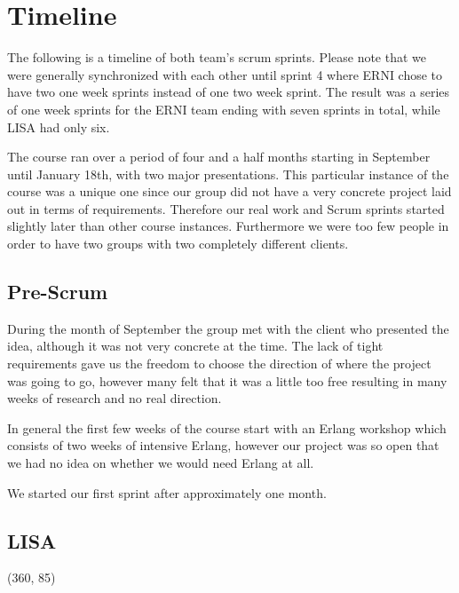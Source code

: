 \section {Timeline}

The following is a timeline of both team's scrum sprints. Please note that we were generally synchronized with each other until sprint 4 where ERNI chose to have two one week sprints instead of one two week sprint. The result was a series of one week sprints for the ERNI team ending with seven sprints in total, while LISA had only six.

The course ran over a period of four and a half months starting in September until January 18th, with two major presentations. This particular instance of the course was a unique one since our group did not have a very concrete project laid out in terms of requirements. Therefore our real work and Scrum sprints started slightly later than other course instances. Furthermore we were too few people in order to have two groups
with two completely different clients.

\subsection{Pre-Scrum}
During the month of September the group met with the client who presented the idea, although it was not very concrete at the time. The lack of tight requirements gave us the freedom to choose the direction of where the project was going to go, however many felt that it was a little too free resulting in many weeks of research and no real direction. 

In general the first few weeks of the course start with an Erlang workshop which consists of two weeks of intensive Erlang, however our project was so open that we had no idea on whether we would need Erlang at all.

We started our first sprint after approximately one month.

\subsection {LISA}
\begin{centering}
\framebox(360, 85){
}
\end{centering}

